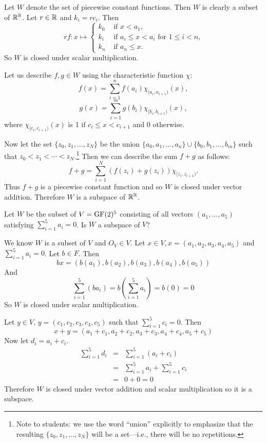 \smallskip
\begin{solution}

Let $W$ denote the set of piecewise constant functions. Then $W$ is clearly a
subset of $\mathbb{R}^{\mathbb{R}}$. Let $r \in \mathbb{R}$ and $k_i = rc_i$. Then
\[
rf : x \mapsto 
\begin{cases}
  k_0 & \text{ if $x < a_1$,}\\
  k_i & \text{ if $a_i\leq x < a_i$ for $1\leq i < n$,}\\
  k_n & \text{ if $a_n\leq x$.}
\end{cases}
\]
So $W$ is closed under scalar multiplication.

Let us describe $f, g \in W$ using the characteristic function $\chi$:
$$f(x) = \sum_{i=1}^n f(a_i)\chi_{[a_i,a_{i+1})}(x),$$
$$g(x) = \sum_{i=1}^m g(b_i)\chi_{[b_i,b_{i+1})}(x),$$
where $\chi_{[c_i,c_{i+1})}(x)$ is 1 if $c_i\leq x < c_{i+1}$ and 0 otherwise.

Now let the set $\{z_0,z_1,\dots, z_N\}$ be the union 
$\{a_0,a_1,\dots ,a_n\}\cup \{b_0,b_1,\dots ,b_m\}$
such that $z_0 < z_1 < \cdots < z_N$.\footnote{Note to students:
we use the word ``union'' explicitly to emphasize that the resulting
 $\{z_0,z_1,\dots, z_N\}$ will be a set---i.e., there will be no repetitions.}
Then we can describe the sum $f + g$ as follows:
$$f+g =  \sum_{i=1}^N (f(z_i)+g(z_i))\chi_{[z_i,z_{i+1})}.$$
Thus $f + g$ is a piecewise constant function and so $W$ is closed under vector
addition.  Therefore $W$ is a subspace of $\mathbb{R}^{\mathbb{R}}$. 
\end{solution}

\probskip

\begin{problem}[Golan 81]

Let $W$ be the subset of $V = \operatorname{GF}(2)^5$ consisting of all vectors 
$(a_1, \dots, a_5)$ satisfying $\sum_{i=1}^5 a_i = 0$.  Is $W$ a subspace of $V$?

\end{problem}
\smallskip
\begin{solution}
We know $W$ is a subset of $V$ and $O_V \in V$. Let $x \in V, x = (a_1,a_2,a_3,a_4,a_5)$ and $\sum_{i=1}^{5}a_i = 0$. Let $b \in F$. Then 
$$bx = (b(a_1),b(a_2),b(a_3),b(a_4),b(a_5))$$
And
$$\sum_{i=1}^{5}(ba_i) = b\left(\sum_{i=1}^{5}a_i\right) = b(0) = 0$$
So $W$ is closed under scalar multiplication.

Let $y \in V$, $y = (c_1,c_2,c_3,c_4,c_5)$ such that $\sum_{i=1}^{5}c_i = 0$.  Then
$$x+y = (a_1+c_1,a_2+c_2,a_3+c_3,a_4+c_4,a_5+c_5)$$
Now let $d_i = a_i + c_i$.
\begin{eqnarray*}
\sum_{i=1}^{5}d_i & = & \sum_{i=1}^{5}(a_i + c_i) \\
				  & = & \sum_{i=1}^{5}a_i + \sum_{i=1}^{5}c_i \\
				  & = & 0 + 0 = 0
\end{eqnarray*}
Therefore $W$ is closed under vector addition and scalar multiplication so it is a subspace.
\end{solution}
\probskip


